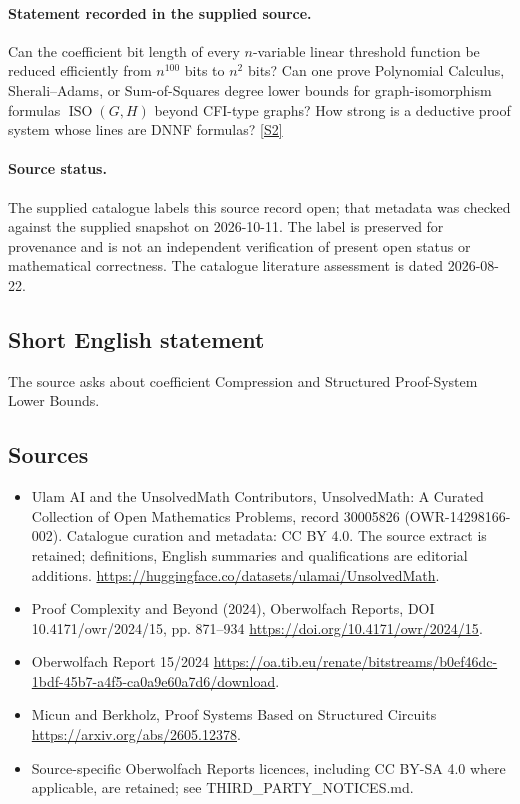 \documentclass[11pt]{article}
\begin{document}
\paragraph{Statement recorded in the supplied source.}
Can the coefficient bit length of every $n$-variable linear threshold function be reduced efficiently from $n^{100}$ bits to $n^2$ bits? Can one prove Polynomial Calculus, Sherali–Adams, or Sum-of-Squares degree lower bounds for graph-isomorphism formulas $\operatorname{ISO}(G,H)$ beyond CFI-type graphs? How strong is a deductive proof system whose lines are DNNF formulas? \href{https://doi.org/10.4171/owr/2024/15}{[S2]}
\paragraph{Source status.}
The supplied catalogue labels this source record open; that metadata was checked against the supplied snapshot on 2026-10-11. The label is preserved for provenance and is not an independent verification of present open status or mathematical correctness. The catalogue literature assessment is dated 2026-08-22.
\subsection{Short English statement}
The source asks about coefficient Compression and Structured Proof-System Lower Bounds.
\subsection{Sources}
\begin{itemize}
\item[S1] Ulam AI and the UnsolvedMath Contributors, UnsolvedMath: A Curated Collection of Open Mathematics Problems, record 30005826 (OWR-14298166-002). Catalogue curation and metadata: CC BY 4.0. The source extract is retained; definitions, English summaries and qualifications are editorial additions.
\url{https://huggingface.co/datasets/ulamai/UnsolvedMath}.
\item[S2] Proof Complexity and Beyond (2024), Oberwolfach Reports, DOI 10.4171/owr/2024/15, pp. 871--934
\url{https://doi.org/10.4171/owr/2024/15}.
\item[S3] Oberwolfach Report 15/2024
\url{https://oa.tib.eu/renate/bitstreams/b0ef46dc-1bdf-45b7-a4f5-ca0a9e60a7d6/download}.
\item[S4] Micun and Berkholz, Proof Systems Based on Structured Circuits
\url{https://arxiv.org/abs/2605.12378}.
\item Source-specific Oberwolfach Reports licences, including CC BY-SA 4.0 where applicable, are retained; see THIRD\_PARTY\_NOTICES.md.
\end{itemize}
\end{document}
